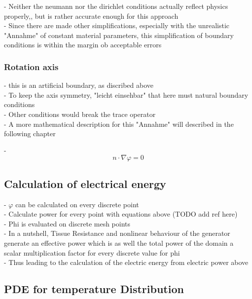 \documentclass[parskip=half, titlepage=yes, 12pt, BCOR=12mm, DIV=calc]{scrartcl}
\begin{document}
- Neither the neumann nor the dirichlet conditions actually reflect physics properly,, but is rather accurate enough for this approach \\
- Since there are made other simplifications, especially with the unrealistic "Annahme" of constant material parameters, this simplification of boundary conditions is within the margin ob acceptable errors


\subsubsection{Rotation axis}

- this is an artificial boundary, as discribed above \\
- To keep the axis symmetry, "leicht einsehbar" that here must natural boundary conditions \\
- Other conditions would break the trace operator \\
- A more mathematical description for this "Annahme" will described in the following chapter

- \begin{equation}
    n \cdot \nabla \varphi = 0
\end{equation}



\subsection{Calculation of electrical energy}

- $\varphi$ can be calculated on every discrete point \\
- Calculate power for every point with equations above (TODO add ref here) \\
- Phi is evaluated on discrete mesh points \\
- In a nutshell, Tissue Resistance and nonlinear behaviour of the generator generate an effective power which is as well the total power of the domain  a scalar multiplication factor for every discrete value for phi \\

- Thus leading to the calculation of the electric energy from electric power above \\


\subsection{PDE for temperature Distribution}
\end{document}
